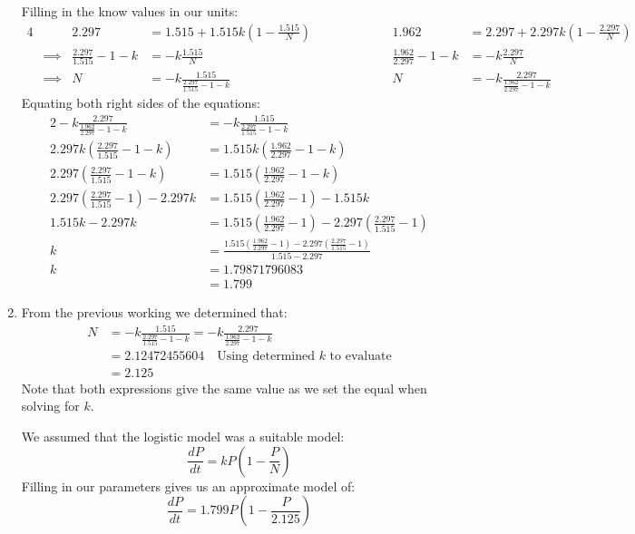 \documentclass[a4paper, 11pt]{article}
\begin{document}
\begin{enumerate}[label=(\alph*)]
  Filling in the know values in our units:  
  \begin{alignat*}{4}
  && 2.297 &= 1.515+1.515k\left( 1  - \frac{1.515}{N} \right)
  &&\qquad\qquad &
    1.962 &= 2.297+2.297k\left( 1  - \frac{2.297}{N} \right)
  \\
  &\implies&\frac{2.297}{1.515}-1-k &=-k\frac{1.515}{N} 
  &&\qquad\qquad&
    \frac{1.962}{2.297}-1-k &=-k\frac{2.297}{N}
  \\
  &\implies&N &=-k\frac{1.515}{\frac{2.297}{1.515}-1-k} 
  &&\qquad\qquad&
    N &=-k\frac{2.297}{\frac{1.962}{2.297}-1-k}
\end{alignat*} 
Equating both right sides of the equations:
 \begin{alignat*}{2}
  -k\frac{2.297}{\frac{1.962}{2.297}-1-k} &=-k\frac{1.515}{\frac{2.297}{1.515}-1-k}\\
     2.297 k \left( \frac{2.297}{1.515}-1-k \right) 
  &= 1.515 k \left( \frac{1.962}{2.297}-1-k \right) \\
     2.297 \left( \frac{2.297}{1.515}-1-k \right) 
  &= 1.515 \left( \frac{1.962}{2.297}-1-k \right) \\
     2.297 \left( \frac{2.297}{1.515}-1 \right) -2.297k 
  &= 1.515 \left( \frac{1.962}{2.297}-1 \right) -1.515k \\
     1.515k - 2.297k 
  &= 1.515 \left( \frac{1.962}{2.297}-1 \right) -2.297 \left( \frac{2.297}{1.515}-1 \right) \\
  k 
  &= \frac{1.515 \left( \frac{1.962}{2.297}-1 \right) -2.297 \left( \frac{2.297}{1.515}-1 \right)}{1.515 - 2.297} \\
  k &= 1.79871796083\\
    &= 1.799
 \end{alignat*} 


  \item From the previous working we determined that:
  \begin{align*}
    N &=-k\frac{1.515}{\frac{2.297}{1.515}-1-k} =-k\frac{2.297}{\frac{1.962}{2.297}-1-k}\\
      &= 2.12472455604\quad\text{Using determined $k$ to evaluate}\\
      &= 2.125
  \end{align*}
  Note that both expressions give the same value as we set the equal when solving for $k$. 

  We assumed that the logistic model was a suitable model: 
  $$\frac{dP}{dt}=kP\left(1-\frac PN\right)$$
  Filling in our parameters gives us an approximate model of: 
  $$\frac{dP}{dt}=1.799P\left(1-\frac P{2.125}\right)$$



\end{enumerate}
\end{document}
